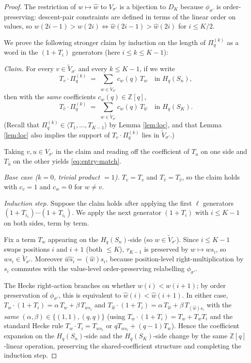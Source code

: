 \documentclass[11pt]{article}
\theoremstyle{definition}
\begin{document}
\begin{proof}
The restriction of $w \mapsto \widehat w$ to $V_{\sigma'}$ is a bijection to $D_K$ because $\phi_{\sigma'}$ is order-preserving: descent-pair constraints are defined in terms of the linear order on values, so $w(2i-1) > w(2i) \iff \widehat w(2i-1) > \widehat w(2i)$ for $i \leq K/2$.

We prove the following stronger claim by induction on the length of $\Pi^{(k)}_q$ as a word in the $(1 + T_i)$ generators (here $i \leq k \leq K-1$):

\emph{Claim.}  For every $v \in \widetilde V_{\sigma'}$ and every $k \leq K-1$, if we write
\[
T_v \cdot \Pi^{(k)}_q \;=\; \sum_{w \in \widetilde V_{\sigma'}} c_w(q)\, T_w \quad\text{in } H_q(S_n),
\]
then with the \emph{same} coefficients $c_w(q) \in \mathbb{Z}[q]$,
\[
T_{\widehat v} \cdot \Pi^{(k)}_q \;=\; \sum_{w \in \widetilde V_{\sigma'}} c_w(q)\, T_{\widehat w} \quad\text{in } H_q(S_K).
\]
(Recall that $\Pi^{(k)}_q \in \langle T_1,\ldots,T_{K-1}\rangle$ by Lemma \ref{lem:loc}, and that Lemma \ref{lem:loc} also implies the support of $T_v \cdot \Pi^{(k)}_q$ lies in $\widetilde V_{\sigma'}$.)

Taking $v, u \in V_{\sigma'}$ in the claim and reading off the coefficient of $T_u$ on one side and $T_{\widehat u}$ on the other yields \eqref{eq:entry-match}.

\emph{Base case ($k = 0$, trivial product $= 1$).}  $T_v = T_v$ and $T_{\widehat v} = T_{\widehat v}$, so the claim holds with $c_v = 1$ and $c_w = 0$ for $w \neq v$.

\emph{Induction step.}  Suppose the claim holds after applying the first $\ell$ generators $(1 + T_{i_1}) \cdots (1 + T_{i_\ell})$.  We apply the next generator $(1 + T_i)$ with $i \leq K-1$ on both sides, term by term.

Fix a term $T_w$ appearing on the $H_q(S_n)$-side (so $w \in \widetilde V_{\sigma'}$).  Since $i \leq K-1$ swaps positions $i$ and $i+1$ (both $\leq K$), $\tau_{K-1}$ is preserved by $w \mapsto ws_i$, so $ws_i \in \widetilde V_{\sigma'}$.  Moreover $\widehat{ws_i} = (\widehat w) s_i$, because position-level right-multiplication by $s_i$ commutes with the value-level order-preserving relabelling $\phi_{\sigma'}$.

The Hecke right-action branches on whether $w(i) < w(i+1)$; by order preservation of $\phi_{\sigma'}$, this is equivalent to $\widehat w(i) < \widehat w(i+1)$.  In either case, $T_w \cdot (1 + T_i) = \alpha\, T_w + \beta\, T_{ws_i}$ and $T_{\widehat w} \cdot (1 + T_i) = \alpha\, T_{\widehat w} + \beta\, T_{(\widehat w) s_i}$ with the \emph{same} $(\alpha, \beta) \in \{(1, 1), (q, q)\}$ (using $T_w \cdot (1 + T_i) = T_w + T_w T_i$ and the standard Hecke rule $T_w \cdot T_i = T_{ws_i}$ or $q T_{ws_i} + (q-1) T_w$).  Hence the coefficient expansion on the $H_q(S_n)$-side and the $H_q(S_K)$-side change by the same $\mathbb{Z}[q]$-linear operation, preserving the shared-coefficient structure and completing the induction step.
\end{proof}
\end{document}
